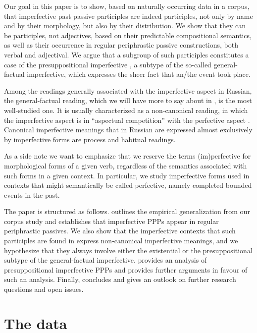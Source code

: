 \documentclass[output=paper,
modfonts,
newtxmath,
hidelinks
]{langscibook}
\begin{document}
Our goal in this paper is to show, based on naturally occurring data in a corpus, that imperfective past passive participles are indeed participles, not only by name and by their morphology, but also by their distribution. We show that they can be participles, not adjectives, based on their predictable compositional semantics, as well as their occurrence in regular periphrastic passive constructions, both verbal and adjectival. We argue that a subgroup of such participles constitutes a case of the presuppositional imperfective \citep[in the sense of][]{gronndiss}, a subtype of the so-called general-factual imperfective, which expresses the sheer fact that an/the event took place. 

Among the readings generally associated with the imperfective aspect in Russian, the general-factual reading, which we will have more to say about in , is the most well-studied one. It is usually characterized as a non-canonical reading, in which the imperfective aspect is in ``aspectual competition'' with the perfective aspect \citep[a term that goes back to at least][]{mathesius38}. Canonical imperfective meanings that in Russian are expressed almost exclusively by imperfective forms are process and habitual readings. 

As a side note we want to emphasize that we reserve the terms (im)perfective for morphological forms of a given verb, regardless of the semantics associated with such forms in a given context. In particular, we study imperfective forms used in contexts that might semantically be called perfective, namely completed bounded events in the past.

The paper is structured as follows.  outlines the empirical generalization from our corpus study and establishes that imperfective PPPs appear in regular periphrastic passives. We also show that the imperfective contexts that such participles are found in express non-canonical imperfective meanings, and we hypothesize that they always involve either the existential or the presuppositional subtype of the general-factual imperfective.  provides an analysis of presuppositional imperfective PPPs and provides further arguments in favour of such an analysis. Finally,  concludes and gives an outlook on further research questions and open issues. 

\section{The data}
\label{data}
\end{document}
